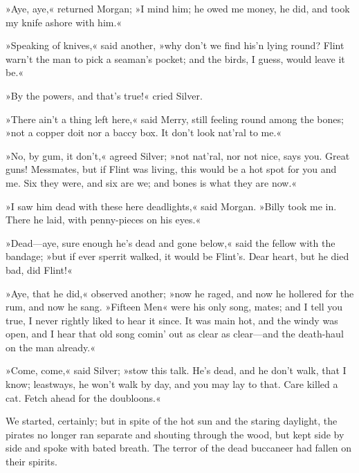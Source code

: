 »Aye, aye,« returned Morgan; »I mind him; he owed me money, he did, and took my knife ashore with him.«

»Speaking of knives,« said another, »why don't we find his'n lying round? Flint warn't the man to pick a seaman's pocket; and the birds, I guess, would leave it be.«

»By the powers, and that's true!« cried Silver.

»There ain't a thing left here,« said Merry, still feeling round among the bones; »not a copper doit nor a baccy box. It don't look nat'ral to me.«

»No, by gum, it don't,« agreed Silver; »not nat'ral, nor not nice, says you. Great guns! Messmates, but if Flint was living, this would be a hot spot for you and me. Six they were, and six are we; and bones is what they are now.«

»I saw him dead with these here deadlights,« said Morgan. »Billy took me in. There he laid, with penny-pieces on his eyes.«

»Dead—aye, sure enough he's dead and gone below,« said the fellow with the bandage; »but if ever sperrit walked, it would be Flint's. Dear heart, but he died bad, did Flint!«

»Aye, that he did,« observed another; »now he raged, and now he hollered for the rum, and now he sang. »Fifteen Men« were his only song, mates; and I tell you true, I never rightly liked to hear it since. It was main hot, and the windy was open, and I hear that old song comin' out as clear as clear—and the death-haul on the man already.«

»Come, come,« said Silver; »stow this talk. He's dead, and he don't walk, that I know; leastways, he won't walk by day, and you may lay to that. Care killed a cat. Fetch ahead for the doubloons.«

We started, certainly; but in spite of the hot sun and the staring daylight, the pirates no longer ran separate and shouting through the wood, but kept side by side and spoke with bated breath. The terror of the dead buccaneer had fallen on their spirits.